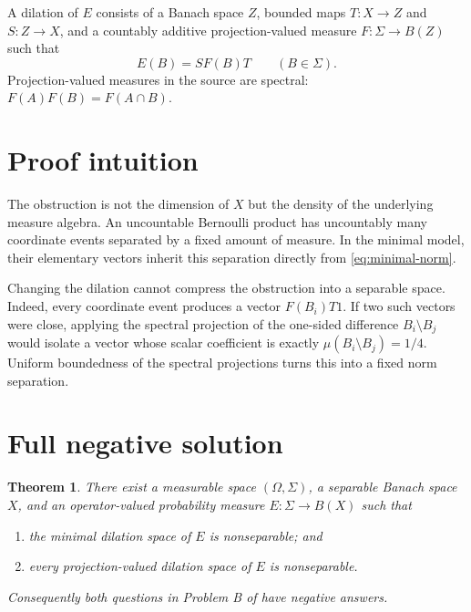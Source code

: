 \documentclass[11pt]{article}
\newtheorem{theorem}{Theorem}
\newcommand{\1}{\mathbf 1}
\begin{document}
A dilation of $E$ consists of a Banach space $Z$, bounded maps
$T:X\to Z$ and $S:Z\to X$, and a countably additive projection-valued
measure $F:\Sigma\to B(Z)$ such that
\begin{equation}\label{eq:dilation}
                 E(B)=S F(B)T \qquad(B\in\Sigma).
\end{equation}
Projection-valued measures in the source are spectral:
$F(A)F(B)=F(A\cap B)$.

\section{Proof intuition}

The obstruction is not the dimension of $X$ but the density of the underlying
measure algebra.  An uncountable Bernoulli product has uncountably many
coordinate events separated by a fixed amount of measure.  In the minimal
model, their elementary vectors inherit this separation directly from
\eqref{eq:minimal-norm}.

Changing the dilation cannot compress the obstruction into a separable space.
Indeed, every coordinate event produces a vector $F(B_i)T1$.  If two such
vectors were close, applying the spectral projection of the one-sided
difference $B_i\setminus B_j$ would isolate a vector whose scalar coefficient
is exactly $\mu(B_i\setminus B_j)=1/4$.  Uniform boundedness of the spectral
projections turns this into a fixed norm separation.

\section{Full negative solution}

\begin{theorem}\label{thm:main}
There exist a measurable space $(\Omega,\Sigma)$, a separable Banach space
$X$, and an operator-valued probability measure $E:\Sigma\to B(X)$ such that

\begin{enumerate}
\item the minimal dilation space of $E$ is nonseparable; and
\item every projection-valued dilation space of $E$ is nonseparable.
\end{enumerate}

Consequently both questions in Problem B of \cite{HLLL} have negative
answers.
\end{theorem}
\end{document}

